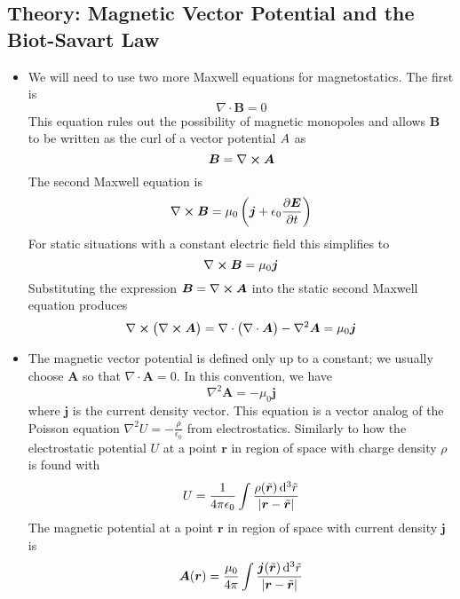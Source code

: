 \documentclass[11pt, a4paper]{article}
\newcommand{\diff}{\mathop{}\!\mathrm{d}} %
\renewcommand{\vec}[1]{\bm{#1}} %
\newcommand{\tvec}[1]{\tilde{\vec{#1}}} %
\renewcommand{\r}{\vec{r}}
\newcommand{\E}{\vec{E}}  %
\newcommand{\B}{\vec{B}}  %
\newcommand{\A}{\vec{A}}  %
\newcommand{\ee}{\epsilon_{0}}  %
\renewcommand{\div}{\nabla \cdot}
\renewcommand{\curl}{\nabla \cross}
\renewcommand{\laplacian}{\nabla^{2}}
\begin{document}
\subsection{Theory: Magnetic Vector Potential and the Biot-Savart Law}
\begin{itemize}
	\item We will need to use two more Maxwell equations for magnetostatics. The first is
	\begin{equation*}
		\div \B = 0
	\end{equation*}
	This equation rules out the possibility of magnetic monopoles and allows $ \B $ to be written as the curl of a vector potential $ \\A $ as
	\begin{equation*}
		\B = \curl \A
	\end{equation*}
	The second Maxwell equation is 
	\begin{equation*}
		\curl \B = \mu_{0}\left(\vec{j} + \ee \pdv{\E}{t}\right)
	\end{equation*}
	For static situations with a constant electric field this simplifies to
	\begin{equation*}
		\curl \B = \mu_{0}\vec{j}
	\end{equation*}
	Substituting the expression $ \B = \curl \A $ into the static second Maxwell equation produces
	\begin{equation*}
		\curl \big(\curl \A\big) = \div \big(\div \A\big) - \laplacian \A = \mu_{0} \vec{j}
	\end{equation*}
	
	\item The magnetic vector potential is defined only up to a constant; we usually choose $ \A $ so that $ \div \A = 0 $. In this convention, we have
	\begin{equation*}
		\laplacian \A = - \mu_{0}\vec{j}
	\end{equation*}
	where $ \vec{j} $ is the current density vector. This equation is a vector analog of the Poisson equation $ \laplacian U = - \frac{\rho}{\ee} $ from electrostatics. Similarly to how the electrostatic potential $ U $ at a point $ \r $ in region of space with charge density $ \rho $ is found with
	\begin{equation*}
		U = \frac{1}{4 \pi \ee} \int \frac{\rho(\tvec{r})\diff^{3}\tilde{r}}{\abs{\r - \tvec{r}}}
	\end{equation*}
	The magnetic potential at a point $ \r $ in region of space with current density $ \vec{j} $ is
	\begin{equation*}
		\A(\r) = \frac{\mu_{0}}{4 \pi} \int \frac{\vec{j}(\tvec{r})\diff^{3}\tilde{r}}{\abs{\r - \tvec{r}}}
	\end{equation*}
	

\end{itemize}
\end{document}
